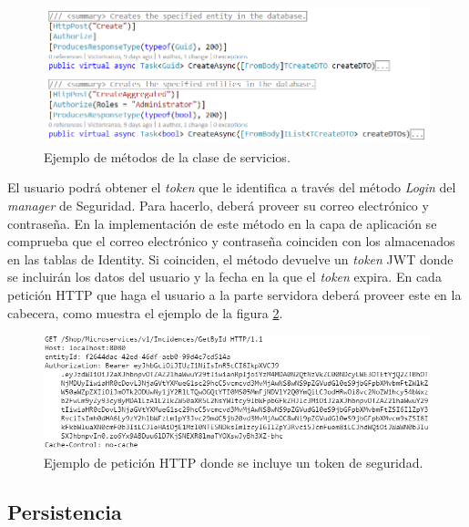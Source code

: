 \documentclass[11pt,spanish,listoffigures]{tfgetsinf}
\begin{document}
\begin{itemize}
\begin{figure}[h]
\centering
\includegraphics[scale=0.7]{Authorize}
\caption{Ejemplo de métodos de la clase de servicios.}
\label{fig:Authorize}
\end{figure}

\end{itemize}

El usuario podrá obtener el \textit{token} que le identifica a través del método \textit{Login} del \textit{manager} de Seguridad. Para hacerlo, deberá proveer su correo electrónico y contraseña. En la implementación de este método en la capa de aplicación se comprueba que el correo electrónico y contraseña coinciden con los almacenados en las tablas de Identity. Si coinciden, el método devuelve un \textit{token} JWT donde se incluirán los datos del usuario y la fecha en la que el \textit{token} expira. En cada petición HTTP que haga el usuario a la parte servidora deberá proveer este en la cabecera, como muestra el ejemplo de la figura \ref{fig:http}.

\begin{figure}[h]
\centering
\includegraphics[scale=0.8]{http}
\caption{Ejemplo de petición HTTP donde se incluye un token de seguridad.}
\label{fig:http}
\end{figure}

\newpage

\subsection{Persistencia} \label{subsect:Persistencia}
\end{document}
